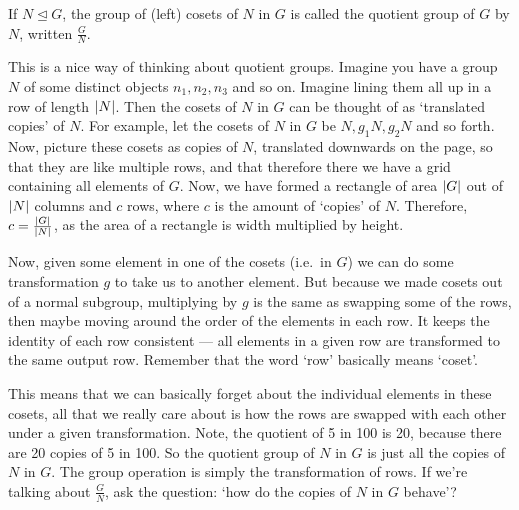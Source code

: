 \begin{definition}
	If \(N \trianglelefteq G\), the group of (left) cosets of \(N\) in \(G\) is called the quotient group of \(G\) by \(N\), written \(\frac{G}{N}\).
\end{definition}

This is a nice way of thinking about quotient groups.
Imagine you have a group \(N\) of some distinct objects \(n_1, n_2, n_3\) and so on.
Imagine lining them all up in a row of length \(\abs{N}\).
Then the cosets of \(N\) in \(G\) can be thought of as `translated copies' of \(N\).
For example, let the cosets of \(N\) in \(G\) be \(N, g_1N, g_2N\) and so forth.
Now, picture these cosets as copies of \(N\), translated downwards on the page, so that they are like multiple rows, and that therefore there we have a grid containing all elements of \(G\).
Now, we have formed a rectangle of area \(\abs{G}\) out of \(\abs{N}\) columns and \(c\) rows, where \(c\) is the amount of `copies' of \(N\).
Therefore, \(c = \frac{\abs{G}}{\abs{N}}\), as the area of a rectangle is width multiplied by height.

Now, given some element in one of the cosets (i.e.\ in \(G\)) we can do some transformation \(g\) to take us to another element.
But because we made cosets out of a normal subgroup, multiplying by \(g\) is the same as swapping some of the rows, then maybe moving around the order of the elements in each row.
It keeps the identity of each row consistent --- all elements in a given row are transformed to the same output row.
Remember that the word `row' basically means `coset'.

This means that we can basically forget about the individual elements in these cosets, all that we really care about is how the rows are swapped with each other under a given transformation.
Note, the quotient of 5 in 100 is 20, because there are 20 copies of 5 in 100.
So the quotient group of \(N\) in \(G\) is just all the copies of \(N\) in \(G\).
The group operation is simply the transformation of rows.
If we're talking about \(\frac{G}{N}\), ask the question: `how do the copies of \(N\) in \(G\) behave'?

